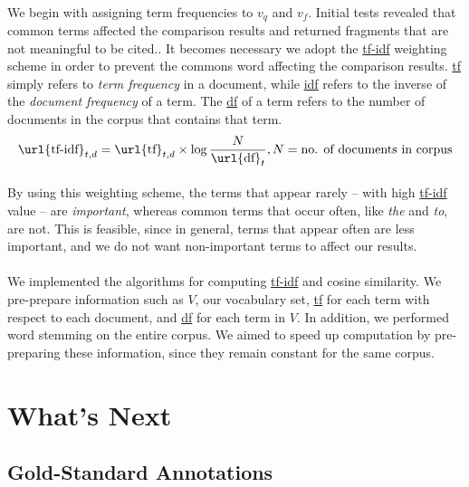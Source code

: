 \documentclass[12 pt]{article}
\begin{document}
\paragraph{}
We begin with assigning term frequencies to $v_q$ and $v_f$. Initial tests revealed that common terms affected the comparison results and returned fragments that are not meaningful to be cited.. It becomes necessary we adopt the \url{tf-idf} weighting scheme in order to prevent the commons word affecting the comparison results. \url{tf} simply refers to \textit{term frequency} in a document, while \url{idf} refers to the inverse of the \textit{document frequency} of a term. The \url{df} of a term refers to the number of documents in the corpus that contains that term.
\begin{equation}
\text{\url{tf-idf}}_{t,d} = \text{\url{tf}}_{t,d} \times \log{\frac{N}{\text{\url{df}}_t}}, N=\text{no. of documents in corpus}
\end{equation}
\paragraph{}
By using this weighting scheme, the terms that appear rarely -- with high \url{tf-idf} value -- are \textit{important}, whereas common terms that occur often, like \textit{the} and \textit{to}, are not. This is feasible, since in general, terms that appear often are less important, and we do not want non-important terms to affect our results.

\paragraph{}
We implemented the algorithms for computing \url{tf-idf} and cosine similarity. We pre-prepare information such as $V$, our vocabulary set, \url{tf} for each term with respect to each document, and \url{df} for each term in $V$. In addition, we performed word stemming on the entire corpus. We aimed to speed up computation by pre-preparing these information, since they remain constant for the same corpus.

\section{What's Next}
\label{whatsnext}
\subsection{Gold-Standard Annotations}
\end{document}
